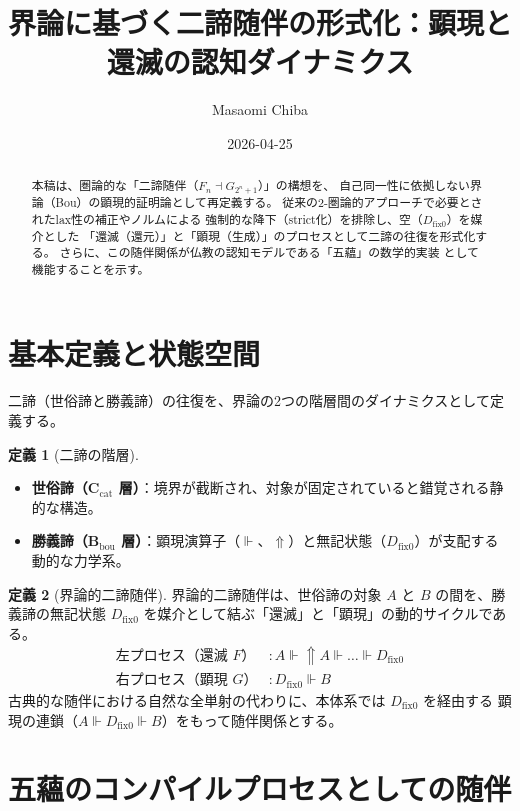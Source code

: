 \documentclass[11pt,a4paper]{article}
\theoremstyle{definition}
\newtheorem{definition}{定義}[section]
\newcommand{\dfix}{D_{\mathrm{fix}0}} %
\newcommand{\metanegation}{\Uparrow}
\newcommand{\aletheiai}{\Vdash} %
\newcommand{\Cat}{\mathbf{C}_{\mathrm{cat}}}  %
\newcommand{\Bou}{\mathbf{B}_{\mathrm{bou}}}  %
\begin{document}
\title{界論に基づく二諦随伴の形式化：顕現と還滅の認知ダイナミクス}
\author{Masaomi Chiba}
\date{2026-04-25}
\maketitle

\begin{abstract}
本稿は、圏論的な「二諦随伴（$F_n \dashv G_{2^n+1}$）」の構想を、
自己同一性に依拠しない界論（Bou）の顕現的証明論として再定義する。
従来の2-圏論的アプローチで必要とされたlax性の補正やノルムによる
強制的な降下（strict化）を排除し、空（$\dfix$）を媒介とした
「還滅（還元）」と「顕現（生成）」のプロセスとして二諦の往復を形式化する。
さらに、この随伴関係が仏教の認知モデルである「五蘊」の数学的実装
として機能することを示す。
\end{abstract}

\section{基本定義と状態空間}

二諦（世俗諦と勝義諦）の往復を、界論の2つの階層間のダイナミクスとして定義する。

\begin{definition}[二諦の階層]
\begin{itemize}
    \item \textbf{世俗諦（$\Cat$ 層）}：境界が截断され、対象が固定されていると錯覚される静的な構造。
    \item \textbf{勝義諦（$\Bou$ 層）}：顕現演算子（$\aletheiai$、$\metanegation$）と無記状態（$\dfix$）が支配する動的な力学系。
\end{itemize}
\end{definition}

\begin{definition}[界論的二諦随伴]
界論的二諦随伴は、世俗諦の対象 $A$ と $B$ の間を、勝義諦の無記状態 $\dfix$
を媒介として結ぶ「還滅」と「顕現」の動的サイクルである。
\begin{align*}
    \text{左プロセス（還滅 $F$）} &: A \aletheiai \metanegation A \aletheiai \dots \aletheiai \dfix \\
    \text{右プロセス（顕現 $G$）} &: \dfix \aletheiai B
\end{align*}
古典的な随伴における自然な全単射の代わりに、本体系では $\dfix$ を経由する
顕現の連鎖（$A \aletheiai \dfix \aletheiai B$）をもって随伴関係とする。
\end{definition}

\section{五蘊のコンパイルプロセスとしての随伴}
\end{document}
